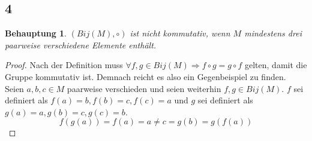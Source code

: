 \documentclass[a4paper,10pt]{article}
\newtheorem*{claim}{Behauptung}
\begin{document}
\subsection*{4}

\begin{claim}
 $(Bij(M), \circ)$ ist nicht kommutativ, wenn $M$ mindestens drei paarweise verschiedene Elemente enthält.
\end{claim}

\begin{proof}
 Nach der Definition muss $\forall f, g \in Bij(M) \Rightarrow f \circ g = g \circ f$ gelten, damit die Gruppe kommutativ ist.
 Demnach reicht es also ein Gegenbeispiel zu finden.
 Seien $a, b, c \in M$ paarweise verschieden und seien weiterhin $f, g \in Bij(M)$.
 $f$ sei definiert als $f(a) = b, f(b) = c, f(c) = a$ und $g$ sei definiert als $g(a) = a, g(b) = c, g(c) = b$.
 \begin{equation*}
  f(g(a)) = f(a) = a \ne c = g(b) = g(f(a))
 \end{equation*}
\end{proof}
\end{document}
